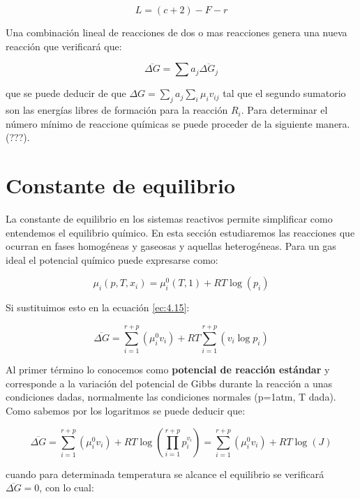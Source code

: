 \documentclass[12pt]{book}
\begin{document}
\begin{equation}
L = (c+2)-F-r
\end{equation}

Una combinación lineal de reacciones de dos o mas reacciones genera una nueva reacción que verificará que:

\begin{equation}
\overline{\Delta G} = \sum a_j \overline{\Delta G_j} \label{ec:4.19}
\end{equation}

que se puede deducir de que $\Delta G = \sum_j a_j  \sum_i \mu_i v_{ij} $ tal que el segundo sumatorio son las energías libres de formación para la reacción $R_i$. Para determinar el número mínimo de reaccione químicas se puede proceder de la siguiente manera. (???).

\section{Constante de equilibrio}

La constante de equilibrio en los sistemas reactivos permite simplificar como entendemos el equilibrio químico. En esta sección estudiaremos las reacciones que ocurran en fases homogéneas y gaseosas y aquellas heterogéneas. Para un gas ideal el potencial químico puede expresarse como:

\begin{equation}
\mu_i (p,T,x_i) = \mu_i^0 (T,1) + RT \log (p_i)
\end{equation}

Si sustituimos esto en la ecuación \ref{ec:4.15}:

\begin{equation}
\overline{\Delta G} =  \sum_{i=1}^{r+p} (\mu_i^0 v_i)+  RT  \sum_{i=1}^{r+p} (v_i \log p_i)
\end{equation}

Al primer término lo conocemos como \textbf{potencial de reacción estándar} y corresponde a la variación del potencial de Gibbs durante la reacción a unas condiciones dadas, normalmente las condiciones normales (p=1atm, T dada). Como sabemos por los logaritmos se puede deducir que:

\begin{equation}
\overline{\Delta G} =  \sum_{i=1}^{r+p} (\mu_i^0 v_i)+  RT \log \left( \prod_{i=1}^{r+p}   p_i^{v_i} \right)  = \sum_{i=1}^{r+p} (\mu_i^0 v_i)+  RT \log ( J )
\end{equation}

cuando para determinada temperatura se alcance el equilibrio se verificará $\overline{ \Delta  G } = 0$, con lo cual:
\end{document}
